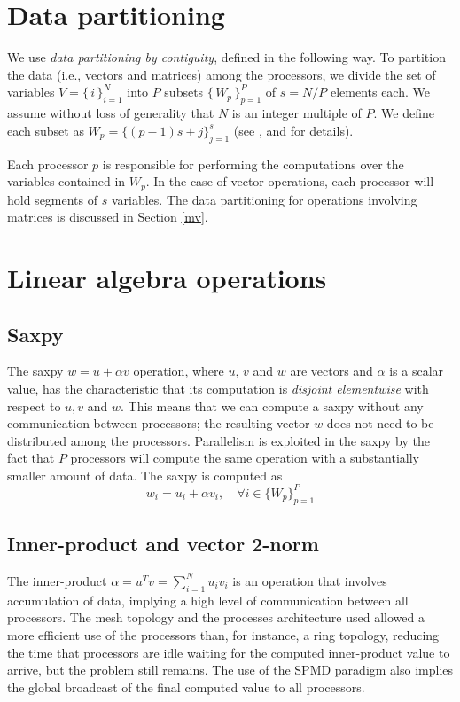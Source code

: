 \documentclass{ecai}
\begin{document}
\section{Data partitioning}
\label{datapart}
We use \emph{data partitioning by contiguity}, defined in the
following way. To partition the data (i.e., vectors and matrices)
among the processors, we divide the set of variables
\mbox{$V=\{\,i\,\}_{i=1}^{N}$} into $P$ subsets
$\{\,W_{p}\,\}_{p=1}^{P}$ of $s=N/P$ elements each. We assume without
loss of generality that $N$ is an integer multiple of $P$. We define
each subset as $W_{p}=\{(p-1)s+j\}_{j=1}^{s}$ (see
\cite{kn:Schofield89}, \cite{kn:daCunha92a} and \cite{kn:Atkin} for
details).

Each processor $p$ is responsible for performing the computations over
the variables contained in $W_{p}$. In the case of vector operations,
each processor will hold segments of $s$ variables. The data
partitioning for operations involving matrices is discussed in Section
\ref{mv}.

\section{Linear algebra operations}
\label{blas}
\subsection{Saxpy}
\label{saxpy}
The saxpy $w=u+\alpha v$ operation, where $u$, $v$ and $w$ are vectors
and $\alpha$ is a scalar value, has the characteristic that its
computation is \emph{disjoint elementwise} with respect to $u, v$ and
$w$. This means that we can compute a saxpy without any communication
between processors; the resulting vector $w$ does not need to be
distributed among the processors. Parallelism is exploited in the
saxpy by the fact that $P$ processors will compute the same operation
with a substantially smaller amount of data. The saxpy is computed as
\begin{equation}
w_{i}=u_{i}+\alpha v_{i},\quad \forall i\in\{W_{p}\}_{p=1}^{P}
\label{distsaxpy}
\end{equation}
\subsection{Inner-product and vector 2-norm}
\label{utv}
The inner-product $\alpha=u^{T}v=\sum_{i=1}^{N}{u_{i}v_{i}}$ is an
operation that involves accumulation of data, implying a high level of
communication between all processors. The mesh topology and the
processes architecture used allowed a more efficient use of the
processors than, for instance, a ring topology, reducing the time that
processors are idle waiting for the computed inner-product value to
arrive, but the problem still remains. The use of the SPMD paradigm
also implies the global broadcast of the final computed value to all
processors.
\end{document}
